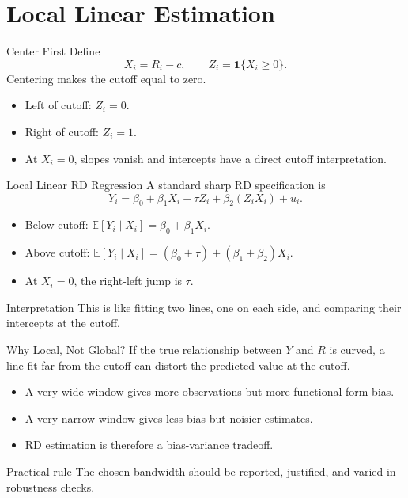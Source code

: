 \documentclass[11pt,aspectratio=169]{beamer}
\newcommand{\E}{\mathbb{E}}
\newcommand{\derivbutton}[1]{\vspace{0.4em}\hfill\hyperlink{app:#1}{\beamerbutton{Appendix details}}}
\begin{document}
\section{Local Linear Estimation}

\begin{frame}{Center First}
  Define
  \[
    X_i=R_i-c,
    \qquad
    Z_i=\mathbf{1}\{X_i\geq 0\}.
  \]
  Centering makes the cutoff equal to zero.
  \begin{itemize}
    \item Left of cutoff: \(Z_i=0\).
    \item Right of cutoff: \(Z_i=1\).
    \item At \(X_i=0\), slopes vanish and intercepts have a direct cutoff interpretation.
  \end{itemize}
\end{frame}

\begin{frame}{Local Linear RD Regression}
  \hypertarget{main:local-linear}{}
  A standard sharp RD specification is
  \[
    Y_i
    =
    \beta_0+\beta_1X_i+\tau Z_i+\beta_2(Z_iX_i)+u_i.
  \]
  \begin{itemize}
    \item Below cutoff: \(\E[Y_i\mid X_i]=\beta_0+\beta_1X_i\).
    \item Above cutoff: \(\E[Y_i\mid X_i]=(\beta_0+\tau)+(\beta_1+\beta_2)X_i\).
    \item At \(X_i=0\), the right-left jump is \(\tau\).
  \end{itemize}
  \begin{block}{Interpretation}
    This is like fitting two lines, one on each side, and comparing their intercepts at the cutoff.
  \end{block}
  \derivbutton{local-linear}
\end{frame}

\begin{frame}{Why Local, Not Global?}
  If the true relationship between \(Y\) and \(R\) is curved, a line fit far from the cutoff can distort the predicted value at the cutoff.
  \begin{itemize}
    \item A very wide window gives more observations but more functional-form bias.
    \item A very narrow window gives less bias but noisier estimates.
    \item RD estimation is therefore a bias-variance tradeoff.
  \end{itemize}
  \begin{block}{Practical rule}
    The chosen bandwidth should be reported, justified, and varied in robustness checks.
  \end{block}
\end{frame}
\end{document}

